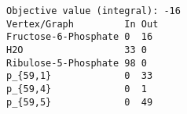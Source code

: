 \begin{verbatim}
Objective value (integral): -16
Vertex/Graph         In Out 
Fructose-6-Phosphate 0  16  
H2O                  33 0   
Ribulose-5-Phosphate 98 0   
p_{59,1}             0  33  
p_{59,4}             0  1   
p_{59,5}             0  49  
\end{verbatim}
